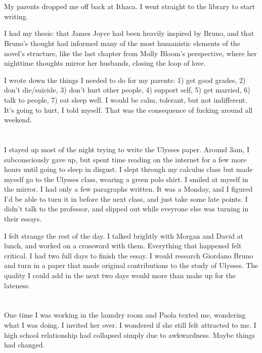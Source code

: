 \section{}

My parents dropped me off back at Ithaca.  I went straight to the library to
start writing.

I had my thesis: that James Joyce had been heavily inspired by Bruno, and that
Bruno's thought had informed many of the most humanistic elements of the novel's
structure, like the last chapter from Molly Bloom's perspective, where her
nighttime thoughts mirror her husbands, closing the loop of love.

I wrote down the things I needed to do for my parents: 1) get good grades, 2)
don't die/suicide, 3) don't hurt other people, 4) support self, 5) get married,
6) talk to people, 7) eat sleep well.  I would be calm, tolerant, but not
indifferent.  It's going to hurt, I told myself.  That was the consequence of
fucking around all weekend.


\section{}

I stayed up most of the night trying to write the Ulysses paper.   Around 3am, I
subconsciously gave up, but spent time reading on the internet for a few more
hours until going to sleep in disgust.  I slept through my calculus class but
made myself go to the Ulysses class, wearing a green polo shirt.  I smiled at
myself in the mirror.  I had only a few paragraphs written.  It was a Monday,
and I figured I'd be able to turn it in before the next class, and just take
some late points.  I didn't talk to the professor, and slipped out while
eveyrone else was turning in their essays.  

I felt strange the rest of the day.  I talked brightly with Morgan and David at
lunch, and worked on a crossword with them.  Everything that happened felt
critical.  I had two full days to finish the essay.  I would research Giordano
Bruno and turn in a paper that made original contributions to the study of
Ulysses. The quality I could add in the next two days would more than make up
for the lateness.  

\section{} 

One time I was working in the laundry room and Paola texted me, wondering what I
was doing.  I invited her over.  I wondered if she still felt attracted to me.
I high school relationship had collapsed simply due to awkwardness.  Maybe
things had changed.  

